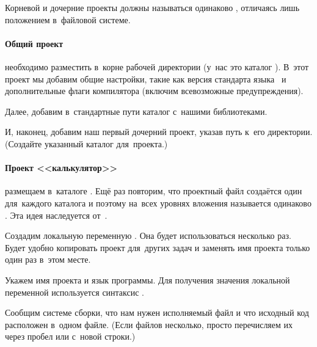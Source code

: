 Корневой и дочерние проекты  должны называться одинаково , отличаясь лишь положением в~файловой системе.



\paragraph{Общий проект}
необходимо разместить в~корне рабочей директории (у~нас это каталог ). В~этот проект мы добавим общие настройки, такие как версия стандарта языка~ и дополнительные флаги компилятора (включим всевозможные предупреждения).


Далее, добавим в~стандартные пути каталог с~нашими библиотеками.


И, наконец, добавим наш первый дочерний проект, указав путь к~его директории. (Создайте указанный каталог для~проекта.)




\paragraph{Проект <<калькулятор>>}\label{sect:calcproj}
размещаем в~каталоге . Ещё раз повторим, что проектный файл создаётся один для~каждого каталога и поэтому на~всех уровнях вложения называется одинаково . Эта идея наследуется от~.

Создадим локальную переменную . Она будет использоваться несколько раз. Будет удобно копировать проект для~других задач и заменять имя проекта только один раз в~этом месте.


Укажем имя проекта и язык программы. Для получения значения локальной переменной используется синтаксис .


Сообщим системе сборки, что нам нужен исполняемый файл и что исходный код расположен в~одном файле. (Если файлов несколько, просто перечисляем их через пробел или с~новой строки.)

